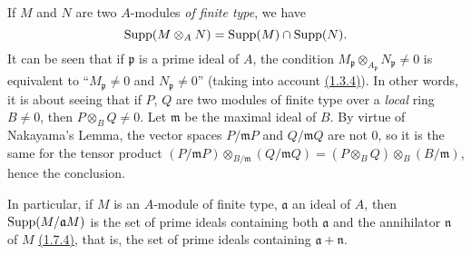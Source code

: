 \begin{env}[1.7.5]
\label{env-0.1.7.5}
If $M$ and $N$ are two $A$-modules {\em of finite type}, we have
\[
  {\mathop{\mathrm{Supp}}\nolimits}(M\otimes_A N)={\mathop{\mathrm{Supp}}\nolimits}(M)\cap{\mathop{\mathrm{Supp}}\nolimits}(N).
\]
It can be seen that if $\mathfrak{p}$ is a prime ideal of $A$, the condition
$M_\mathfrak{p}\otimes_{A_\mathfrak{p}}N_\mathfrak{p}\neq 0$ is equivalent to
``$M_\mathfrak{p}\neq 0$ and $N_\mathfrak{p}\neq 0$'' (taking into account
\hyperref[env-0.1.3.4]{(1.3.4)}). In other words, it is about seeing that if $P$, $Q$ are two
modules of finite type over a {\em local} ring $B\neq 0$, then
$P\otimes_B Q\neq 0$. Let $\mathfrak{m}$ be the maximal ideal of $B$. By virtue
of Nakayama's Lemma, the vector spaces $P/\mathfrak{m}P$ and $Q/\mathfrak{m}Q$
are not $0$, so it is the same for the tensor product
$(P/\mathfrak{m}P)\otimes_{B/\mathfrak{m}}(Q/\mathfrak{m}Q)
  =(P\otimes_B Q)\otimes_B(B/\mathfrak{m})$, hence the conclusion.

In particular, if $M$ is an $A$-module of finite type, $\mathfrak{a}$ an ideal
of $A$, then ${\mathop{\mathrm{Supp}}\nolimits}(M/\mathfrak{a}M)$ is the set of prime ideals containing both
$\mathfrak{a}$ and the annihilator $\mathfrak{n}$ of $M$ \hyperref[env-0.1.7.4]{(1.7.4)}, that
is, the set of prime ideals containing $\mathfrak{a}+\mathfrak{n}$.
\end{env}


